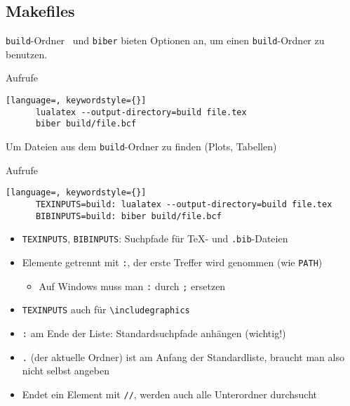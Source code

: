 \subsection{Makefiles}

\begin{frame}[fragile]{\texttt{build}-Ordner}
  \LuaTeX\ und \texttt{biber} bieten Optionen an, um einen \texttt{build}-Ordner zu benutzen.
  \begin{block}{Aufrufe}
    \begin{lstlisting}[language=, keywordstyle={}]
      lualatex --output-directory=build file.tex
      biber build/file.bcf
    \end{lstlisting}
  \end{block}

  Um Dateien aus dem \texttt{build}-Ordner zu finden (Plots, Tabellen)
  \begin{block}{Aufrufe}
    \begin{lstlisting}[language=, keywordstyle={}]
      TEXINPUTS=build: lualatex --output-directory=build file.tex
      BIBINPUTS=build: biber build/file.bcf
    \end{lstlisting}
  \end{block}
  \vspace*{-0.5em}
  \begin{itemize}
    \item \texttt{TEXINPUTS}, \texttt{BIBINPUTS}: Suchpfade für \TeX- und \texttt{.bib}-Dateien
    \item Elemente getrennt mit \texttt{:}, der erste Treffer wird genommen (wie \texttt{PATH})
      \begin{itemize}
        \item Auf Windows muss man \texttt{:} durch \texttt{;} ersetzen
      \end{itemize}
    \item \texttt{TEXINPUTS} auch für \lstinline+\includegraphics+
    \item \texttt{:} am Ende der Liste: Standardsuchpfade anhängen (wichtig!)
    \item \texttt{.} (der aktuelle Ordner) ist am Anfang der Standardliste, braucht man also nicht selbst angeben
    \item Endet ein Element mit \texttt{//}, werden auch alle Unterordner durchsucht
  \end{itemize}
\end{frame}

